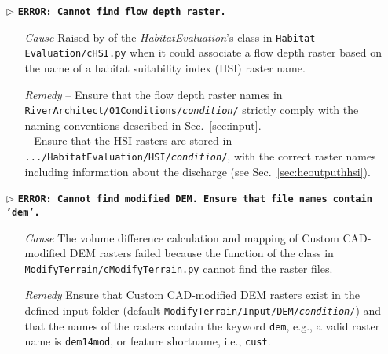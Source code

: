 \begin{itemize}
	\item[$\triangleright$]\textbf{\texttt{ERROR: Cannot find flow depth raster.}}
	\begin{itemize}
		\item[\textit{Cause}\hspace{0.27cm}] Raised by  of the \textit{HabitatEvaluation}'s  class in \texttt{Habitat Evaluation/cHSI.py} when it could associate a flow depth raster based on the name of a habitat suitability index (HSI) raster name.
		\item[\textit{Remedy}] -- Ensure that the flow depth raster names in \texttt{RiverArchitect/01{\myUnderscore}Conditions/\textit{condition}/} strictly comply with the naming conventions described in Sec.~\ref{sec:input}.\\
							   -- Ensure that the HSI rasters are stored in \texttt{.../HabitatEvaluation/HSI/\textit{condition}/}, with the correct raster names including information about the discharge (see Sec.~\ref{sec:heoutputhhsi}).\\
	\end{itemize}
	
	\item[$\triangleright$]\textbf{\texttt{ERROR: Cannot find modified DEM. Ensure that file names contain 'dem'.}}
	\begin{itemize}
		\item[\textit{Cause}\hspace{0.27cm}] The volume difference calculation and mapping of Custom CAD-modified DEM rasters failed because the  function of the  class in \texttt{ModifyTerrain/cModifyTerrain.py} cannot find the raster files.
		\item[\textit{Remedy}] Ensure that Custom CAD-modified DEM rasters exist in the defined input folder (default \texttt{ModifyTerrain/Input/DEM/\textit{condition}/}) and that the names of the rasters contain the keyword \texttt{dem}, e.g., a valid raster name is \texttt{dem14{\myUnderscore}mod}, or feature shortname, i.e., \texttt{cust}.\\
	\end{itemize}
	

\end{itemize}
